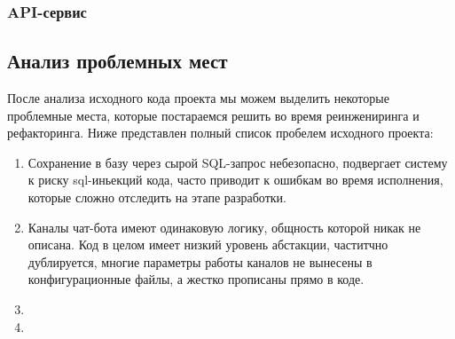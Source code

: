     \subsubsection{API-сервис}


    \subsection{Анализ проблемных мест}
    После анализа исходного кода проекта мы можем выделить некоторые проблемные места, которые постараемся решить во время
    реинжениринга и рефакторинга. Ниже представлен полный список пробелем исходного проекта:
    \begin{enumerate}
        \item Сохранение в базу через сырой SQL-запрос небезопасно, подвергает систему к риску sql-иньекций кода, часто приводит
        к ошибкам во время исполнения, которые сложно отследить на этапе разработки.
        \item Каналы чат-бота имеют одинаковую логику, общность которой никак не описана. Код в целом имеет низкий уровень
        абстакции, частитчно дублируется, многие параметры работы каналов не вынесены в конфигурационные файлы, а жестко
        прописаны прямо в коде.
        \item 
        \item 
    \end{enumerate}

